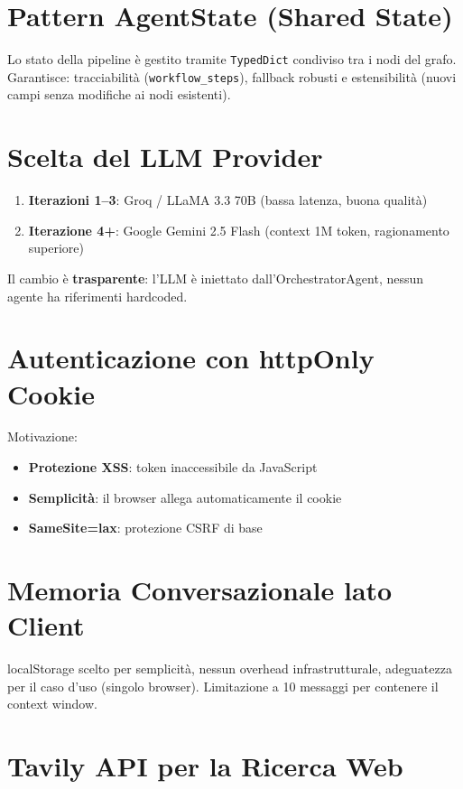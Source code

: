 \documentclass[a4paper,12pt]{report}
\begin{document}
\section{Pattern AgentState (Shared State)}

Lo stato della pipeline è gestito tramite \texttt{TypedDict} condiviso tra i nodi del grafo. Garantisce: tracciabilità (\texttt{workflow\_steps}), fallback robusti e estensibilità (nuovi campi senza modifiche ai nodi esistenti).

\section{Scelta del LLM Provider}

\begin{enumerate}
    \item \textbf{Iterazioni 1--3}: Groq / LLaMA 3.3 70B (bassa latenza, buona qualità)
    \item \textbf{Iterazione 4+}: Google Gemini 2.5 Flash (context 1M token, ragionamento superiore)
\end{enumerate}

Il cambio è \textbf{trasparente}: l'LLM è iniettato dall'OrchestratorAgent, nessun agente ha riferimenti hardcoded.

\section{Autenticazione con httpOnly Cookie}

Motivazione:
\begin{itemize}
    \item \textbf{Protezione XSS}: token inaccessibile da JavaScript
    \item \textbf{Semplicità}: il browser allega automaticamente il cookie
    \item \textbf{SameSite=lax}: protezione CSRF di base
\end{itemize}

\section{Memoria Conversazionale lato Client}

localStorage scelto per semplicità, nessun overhead infrastrutturale, adeguatezza per il caso d'uso (singolo browser). Limitazione a 10 messaggi per contenere il context window.

\section{Tavily API per la Ricerca Web}
\end{document}
